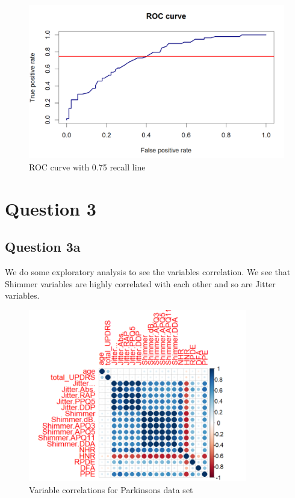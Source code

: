 \documentclass[
]{article}
\begin{document}
\begin{figure}
\centering
\includegraphics[width=5.38542in,height=\textheight]{roc_curve_ipl.png}
\caption{ROC curve with 0.75 recall line}
\end{figure}

\hypertarget{question-3}{%
\section{Question 3}\label{question-3}}

\hypertarget{question-3a}{%
\subsection{Question 3a}\label{question-3a}}

We do some exploratory analysis to see the variables correlation. We see
that Shimmer variables are highly correlated with each other and so are
Jitter variables.

\begin{figure}
\centering
\includegraphics[width=3.76042in,height=\textheight]{corr_parkinsons.png}
\caption{Variable correlations for Parkinsons data set}
\end{figure}
\end{document}
